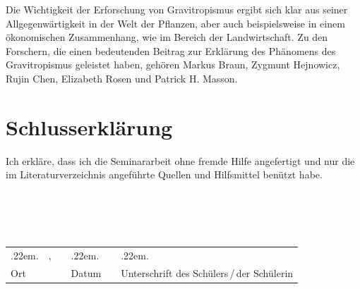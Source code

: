 \documentclass[
11pt, 
ngerman,
listof=totocnumbered,
oneside,
bibliography=totocnumbered,
abstracton
]{scrreprt}
\makeatletter
\newcommand \Dotfill {\leavevmode \cleaders \hb@xt@ .22em{\hss .\hss }\hfill \kern \z@}
\makeatother
\begin{document}
Die Wichtigkeit der Erforschung von Gravitropismus ergibt sich klar aus seiner Allgegenwärtigkeit in der Welt der Pflanzen, aber auch beispielsweise in einem ökonomischen Zusammenhang, wie im Bereich der Landwirtschaft\parencite[343]{Chen1999}. Zu den Forschern, die einen bedeutenden Beitrag zur Erklärung des Phänomens des Gravitropismus geleistet haben, gehören Markus Braun, Zygmunt Hejnowicz, Rujin Chen, Elizabeth Rosen und Patrick H. Masson.


\printbibliography

\listoffigures

\chapter {Schlusserklärung}

Ich erkläre, dass ich die Seminararbeit ohne fremde Hilfe angefertigt und nur die im Literaturverzeichnis angeführte Quellen und Hilfsmittel benützt habe.
\\
\\
\\
\\
\\
\setlength\tabcolsep{0pt}\noindent\hspace{-.2mm}\begin{tabular}{p{} p{} p{} p{} p{} p{}}
	\Dotfill & \hfill, & & \Dotfill &  & \Dotfill \\ 
 \hspace{.2mm}Ort & & &  \hspace{.2mm}Datum &  &  \hspace{.2mm}Unterschrift des Schülers\,/\,der Schülerin \\
\end{tabular}
\end{document}
